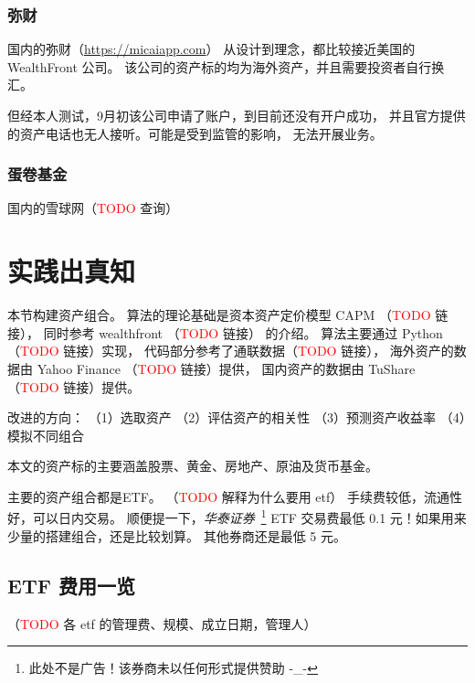 \documentclass[a4paper, 11pt, UTF8]{report}
\begin{document}
\subsection{弥财}

国内的弥财（\underline{https://micaiapp.com}）
从设计到理念，都比较接近美国的 WealthFront 公司。
该公司的资产标的均为海外资产，并且需要投资者自行换汇。

但经本人测试，9月初该公司申请了账户，到目前还没有开户成功，
并且官方提供的资产电话也无人接听。可能是受到监管的影响，
无法开展业务。

\subsection{蛋卷基金}

国内的雪球网（\textcolor{red}{TODO} 查询）


\chapter{实践出真知}


本节构建资产组合。
算法的理论基础是资本资产定价模型 CAPM （\textcolor{red}{TODO} 链接），
同时参考 wealthfront （\textcolor{red}{TODO} 链接） 的介绍。
算法主要通过 Python （\textcolor{red}{TODO} 链接）实现，
代码部分参考了通联数据（\textcolor{red}{TODO} 链接），
海外资产的数据由 Yahoo Finance （\textcolor{red}{TODO} 链接）提供，
国内资产的数据由 TuShare （\textcolor{red}{TODO} 链接）提供。

改进的方向：
（1）选取资产
（2）评估资产的相关性
（3）预测资产收益率
（4）模拟不同组合

本文的资产标的主要涵盖股票、黄金、房地产、原油及货币基金。

主要的资产组合都是ETF。
（\textcolor{red}{TODO} 解释为什么要用 etf）
手续费较低，流通性好，可以日内交易。
顺便提一下，\emph{华泰证券}~\footnote{此处不是广告！该券商未以任何形式提供赞助 -\_- }
 ETF 交易费最低 0.1 元！如果用来少量的搭建组合，还是比较划算。
其他券商还是最低 5 元。



\section{ETF 费用一览}

（\textcolor{red}{TODO} 各 etf 的管理费、规模、成立日期，管理人）
\end{document}

